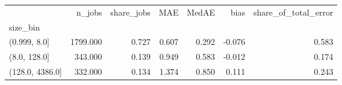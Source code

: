 \begin{tabular}{lrrrrrr}
\toprule
 & n_jobs & share_jobs & MAE & MedAE & bias & share_of_total_error \\
size_bin &  &  &  &  &  &  \\
\midrule
(0.999, 8.0] & 1799.000 & 0.727 & 0.607 & 0.292 & -0.076 & 0.583 \\
(8.0, 128.0] & 343.000 & 0.139 & 0.949 & 0.583 & -0.012 & 0.174 \\
(128.0, 4386.0] & 332.000 & 0.134 & 1.374 & 0.850 & 0.111 & 0.243 \\
\bottomrule
\end{tabular}
